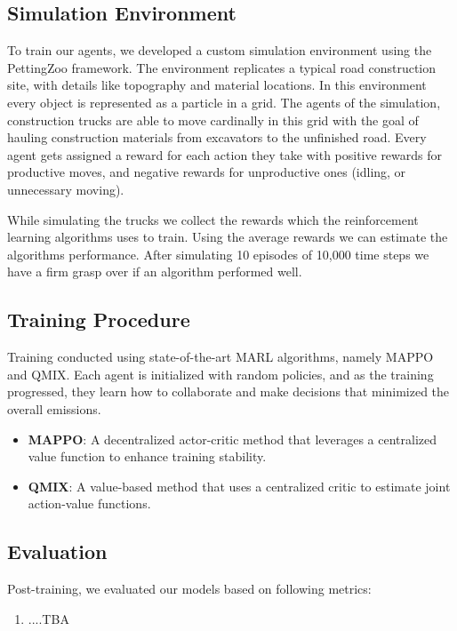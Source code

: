 \documentclass[conference]{IEEEtran}
\begin{document}
\subsection{Simulation Environment}
To train our agents, we developed a custom simulation environment using the PettingZoo framework. The environment replicates a typical road construction site, with details like topography and material locations. In this environment every object is represented as a particle in a grid. 
The agents of the simulation, construction trucks are able to move cardinally in this grid with the goal of hauling construction materials from excavators to the unfinished road. 
Every agent gets assigned a reward for each action they take with positive rewards for productive moves, and negative rewards for unproductive ones (idling, or unnecessary moving). 

While simulating the trucks we collect the rewards which the reinforcement learning algorithms uses to train.
Using the average rewards we can estimate the algorithms performance. After simulating 10 episodes of 10,000 time steps we have a firm grasp over if an algorithm performed well.

\subsection{Training Procedure}
Training conducted using state-of-the-art MARL algorithms, namely MAPPO and QMIX. Each agent is initialized with random policies, and as the training progressed, they learn how to collaborate and make decisions that minimized the overall emissions.

\begin{itemize}
\item \textbf{MAPPO}: A decentralized actor-critic method that leverages a centralized value function to enhance training stability.
\item \textbf{QMIX}: A value-based method that uses a centralized critic to estimate joint action-value functions.
\end{itemize}

\subsection{Evaluation}
Post-training, we evaluated our models based on following metrics:
\begin{enumerate}
\item ....TBA
\end{enumerate}
\end{document}
